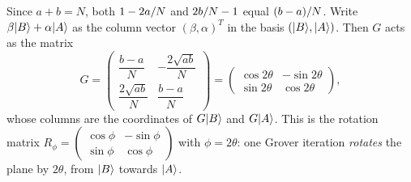Since $a + b = N$, both $1 - 2a/N$ and $2b/N - 1$ equal $(b - a)/N$. Write
$\beta\lvert B \rangle + \alpha\lvert A \rangle$ as the column vector $(\beta, \alpha)^{T}$ in the basis
$(\lvert B \rangle, \lvert A \rangle)$. Then $G$ acts as the matrix
\begin{equation}\label{eq:gmatrix-1006}
    G = \begin{pmatrix} \dfrac{b - a}{N} & -\dfrac{2\sqrt{ab}}{N} \\[2ex] \dfrac{2\sqrt{ab}}{N} & \dfrac{b - a}{N} \end{pmatrix}
    = \begin{pmatrix} \cos 2\theta & -\sin 2\theta \\ \sin 2\theta & \cos 2\theta \end{pmatrix},
\end{equation}
whose columns are the coordinates of $G\lvert B \rangle$ and $G\lvert A \rangle$. This is the rotation matrix
$R_{\phi} = \left(\begin{smallmatrix} \cos\phi & -\sin\phi \\ \sin\phi & \cos\phi \end{smallmatrix}\right)$
with $\phi = 2\theta$: one Grover iteration \emph{rotates} the plane by $2\theta$, from $\lvert B \rangle$
towards $\lvert A \rangle$.


